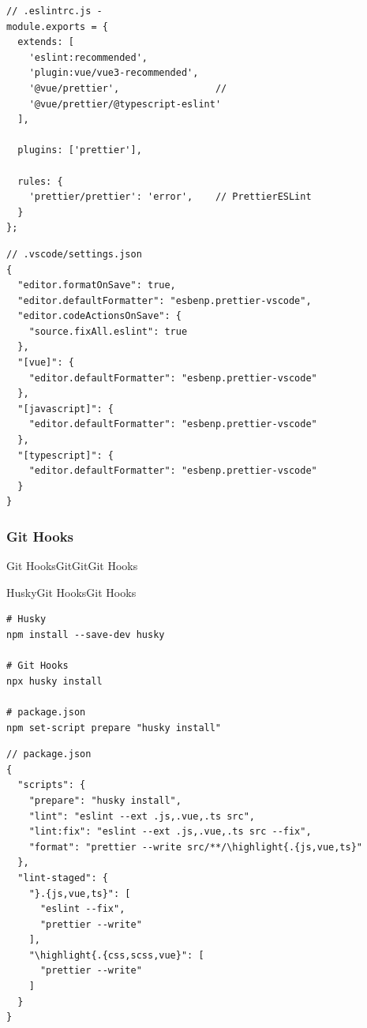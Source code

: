 \begin{lstlisting}[style=javascript]
// .eslintrc.js - 
module.exports = {
  extends: [
    'eslint:recommended',
    'plugin:vue/vue3-recommended',
    '@vue/prettier',                 // 
    '@vue/prettier/@typescript-eslint'
  ],
  
  plugins: ['prettier'],
  
  rules: {
    'prettier/prettier': 'error',    // PrettierESLint
  }
};
\end{lstlisting}


\begin{lstlisting}[style=json]
// .vscode/settings.json
{
  "editor.formatOnSave": true,
  "editor.defaultFormatter": "esbenp.prettier-vscode",
  "editor.codeActionsOnSave": {
    "source.fixAll.eslint": true
  },
  "[vue]": {
    "editor.defaultFormatter": "esbenp.prettier-vscode"
  },
  "[javascript]": {
    "editor.defaultFormatter": "esbenp.prettier-vscode"
  },
  "[typescript]": {
    "editor.defaultFormatter": "esbenp.prettier-vscode"
  }
}
\end{lstlisting}

\hypertarget{git-hooks}{%
\subsubsection{Git Hooks}\label{git-hooks}}

Git HooksGitGitGit Hooks


HuskyGit HooksGit Hooks

\begin{lstlisting}[style=terminal]
# Husky
npm install --save-dev husky

# Git Hooks
npx husky install

# package.json
npm set-script prepare "husky install"
\end{lstlisting}

\begin{lstlisting}[style=javascript]
// package.json
{
  "scripts": {
    "prepare": "husky install",
    "lint": "eslint --ext .js,.vue,.ts src",
    "lint:fix": "eslint --ext .js,.vue,.ts src --fix",
    "format": "prettier --write src/**/\highlight{.{js,vue,ts}"
  },
  "lint-staged": {
    "}.{js,vue,ts}": [
      "eslint --fix",
      "prettier --write"
    ],
    "\highlight{.{css,scss,vue}": [
      "prettier --write"
    ]
  }
}
\end{lstlisting}

